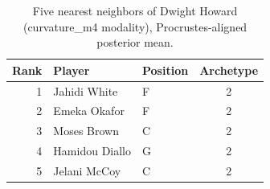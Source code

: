 \begin{table}[htbp]
  \centering\small
  \begin{tabular}{rllc}
    \toprule
    Rank & Player & Position & Archetype \\
    \midrule
    1 & Jahidi White & F & 2 \\
    2 & Emeka Okafor & F & 2 \\
    3 & Moses Brown & C & 2 \\
    4 & Hamidou Diallo & G & 2 \\
    5 & Jelani McCoy & C & 2 \\
    \bottomrule
  \end{tabular}
  \caption{Five nearest neighbors of Dwight Howard (curvature_m4 modality), Procrustes-aligned posterior mean.}
  \label{tab:Dwight_Howard_neighbors_curvature_m4}
\end{table}


